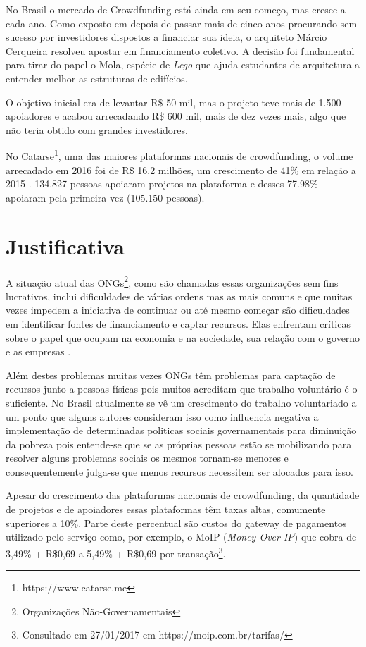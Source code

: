 No Brasil o mercado de Crowdfunding está ainda em seu começo, mas cresce a cada ano. Como exposto em  \cite{globo-financiamento} depois de passar mais de cinco anos procurando sem sucesso por investidores dispostos a financiar sua ideia, o arquiteto Márcio Cerqueira resolveu apostar em financiamento coletivo. A decisão foi fundamental para tirar do papel o Mola, espécie de \emph{Lego} que ajuda estudantes de arquitetura a entender melhor as estruturas de edifícios.

O objetivo inicial era de levantar R\$ 50 mil, mas o projeto teve mais de 1.500 apoiadores e acabou arrecadando R\$ 600 mil, mais de dez vezes mais, algo que não teria obtido com grandes investidores.

No Catarse\footnote{https://www.catarse.me}, uma das maiores plataformas nacionais de crowdfunding, o volume arrecadado em 2016 foi de R\$ 16.2 milhões, um crescimento de 41\% em relação a 2015 \cite{catarse-retrospectiva2016}. 134.827 pessoas apoiaram projetos na plataforma e desses 77.98\% apoiaram pela primeira vez (105.150 pessoas).



\section{Justificativa}
A situação atual das ONGs\footnote{Organizações Não-Governamentais}, como são chamadas essas organizações sem fins lucrativos, inclui dificuldades de várias ordens mas as mais comuns e que muitas vezes impedem a iniciativa de continuar ou até mesmo começar são dificuldades em identificar fontes de financiamento e captar recursos. Elas enfrentam críticas sobre o papel que ocupam na economia e na sociedade, sua relação com o governo e as empresas \cite{GOUVEIA2007}.

Além destes problemas muitas vezes ONGs têm problemas para captação de recursos junto a pessoas físicas pois muitos acreditam que trabalho voluntário é o suficiente. No Brasil atualmente se vê um crescimento do trabalho voluntariado a um ponto que alguns autores \cite{fagundes2012repercussoes} consideram isso como influencia negativa a implementação de determinadas politicas sociais governamentais para diminuição da pobreza pois entende-se que se as próprias pessoas estão se mobilizando para resolver alguns problemas sociais os mesmos tornam-se menores e consequentemente julga-se que menos recursos necessitem ser alocados para isso.

Apesar do crescimento das plataformas nacionais de crowdfunding, da quantidade de projetos e de apoiadores essas plataformas têm taxas altas, comumente superiores a 10\%. Parte deste percentual são custos do gateway de pagamentos utilizado pelo serviço como, por exemplo, o MoIP (\emph{Money Over IP}) que cobra de 3,49\% + R\$0,69 a 5,49\% + R\$0,69 por transação\footnote{Consultado em 27/01/2017 em https://moip.com.br/tarifas/}.


